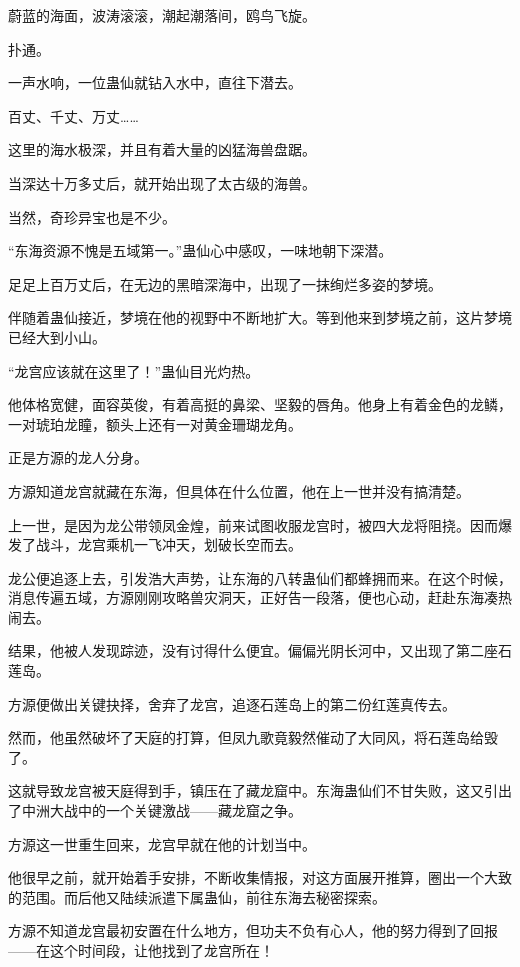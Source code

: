 
\begin{this_body}

蔚蓝的海面，波涛滚滚，潮起潮落间，鸥鸟飞旋。

扑通。

一声水响，一位蛊仙就钻入水中，直往下潜去。

百丈、千丈、万丈……

这里的海水极深，并且有着大量的凶猛海兽盘踞。

当深达十万多丈后，就开始出现了太古级的海兽。

当然，奇珍异宝也是不少。

“东海资源不愧是五域第一。”蛊仙心中感叹，一味地朝下深潜。

足足上百万丈后，在无边的黑暗深海中，出现了一抹绚烂多姿的梦境。

伴随着蛊仙接近，梦境在他的视野中不断地扩大。等到他来到梦境之前，这片梦境已经大到小山。

“龙宫应该就在这里了！”蛊仙目光灼热。

他体格宽健，面容英俊，有着高挺的鼻梁、坚毅的唇角。他身上有着金色的龙鳞，一对琥珀龙瞳，额头上还有一对黄金珊瑚龙角。

正是方源的龙人分身。

方源知道龙宫就藏在东海，但具体在什么位置，他在上一世并没有搞清楚。

上一世，是因为龙公带领凤金煌，前来试图收服龙宫时，被四大龙将阻挠。因而爆发了战斗，龙宫乘机一飞冲天，划破长空而去。

龙公便追逐上去，引发浩大声势，让东海的八转蛊仙们都蜂拥而来。在这个时候，消息传遍五域，方源刚刚攻略兽灾洞天，正好告一段落，便也心动，赶赴东海凑热闹去。

结果，他被人发现踪迹，没有讨得什么便宜。偏偏光阴长河中，又出现了第二座石莲岛。

方源便做出关键抉择，舍弃了龙宫，追逐石莲岛上的第二份红莲真传去。

然而，他虽然破坏了天庭的打算，但凤九歌竟毅然催动了大同风，将石莲岛给毁了。

这就导致龙宫被天庭得到手，镇压在了藏龙窟中。东海蛊仙们不甘失败，这又引出了中洲大战中的一个关键激战——藏龙窟之争。

方源这一世重生回来，龙宫早就在他的计划当中。

他很早之前，就开始着手安排，不断收集情报，对这方面展开推算，圈出一个大致的范围。而后他又陆续派遣下属蛊仙，前往东海去秘密探索。

方源不知道龙宫最初安置在什么地方，但功夫不负有心人，他的努力得到了回报——在这个时间段，让他找到了龙宫所在！


\end{this_body}

